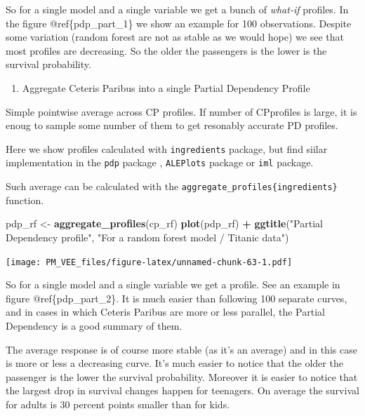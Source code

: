 \documentclass[12pt,]{krantz}
\newenvironment{Shaded}{\begin{snugshade}}{\end{snugshade}}
\newcommand{\KeywordTok}[1]{\textcolor[rgb]{0.13,0.29,0.53}{\textbf{#1}}}
\newcommand{\NormalTok}[1]{#1}
\newcommand{\OperatorTok}[1]{\textcolor[rgb]{0.81,0.36,0.00}{\textbf{#1}}}
\newcommand{\StringTok}[1]{\textcolor[rgb]{0.31,0.60,0.02}{#1}}
\providecommand{\tightlist}{%
  \setlength{\itemsep}{0pt}\setlength{\parskip}{0pt}}
\theoremstyle{definition}
\theoremstyle{definition}
\theoremstyle{definition}
\theoremstyle{remark}
\begin{document}
So for a single model and a single variable we get a bunch of
\emph{what-if} profiles. In the figure @ref\{pdp\_part\_1\} we show an
example for 100 observations. Despite some variation (random forest are
not as stable as we would hope) we see that most profiles are
decreasing. So the older the passengers is the lower is the survival
probability.

\begin{enumerate}
\def\labelenumi{\arabic{enumi}.}
\setcounter{enumi}{1}
\tightlist
\item
  Aggregate Ceteris Paribus into a single Partial Dependency Profile
\end{enumerate}

Simple pointwise average across CP profiles. If number of CPprofiles is
large, it is enoug to sample some number of them to get resonably
accurate PD profiles.

Here we show profiles calculated with \texttt{ingredients} package, but
find siilar implementation in the \texttt{pdp} package \citep{pdp},
\texttt{ALEPlots} package \citep{R-ALEPlot} or \texttt{iml} \citep{iml}
package.

Such average can be calculated with the
\texttt{aggregate\_profiles\{ingredients\}} function.

\begin{Shaded}
\begin{Highlighting}[]
\NormalTok{pdp_rf <-}\StringTok{ }\KeywordTok{aggregate_profiles}\NormalTok{(cp_rf)}
\KeywordTok{plot}\NormalTok{(pdp_rf) }\OperatorTok{+}
\StringTok{  }\KeywordTok{ggtitle}\NormalTok{(}\StringTok{"Partial Dependency profile"}\NormalTok{, }\StringTok{"For a random forest model / Titanic data"}\NormalTok{) }
\end{Highlighting}
\end{Shaded}

\texttt{[image: PM\_VEE\_files/figure-latex/unnamed-chunk-63-1.pdf]}

So for a single model and a single variable we get a profile. See an
example in figure @ref\{pdp\_part\_2\}. It is much easier than following
100 separate curves, and in cases in which Ceteris Paribus are more or
less parallel, the Partial Dependency is a good summary of them.

The average response is of course more stable (as it's an average) and
in this case is more or less a decreasing curve. It's much easier to
notice that the older the passenger is the lower the survival
probability. Moreover it is easier to notice that the largest drop in
survival changes happen for teenagers. On average the survival for
adults is 30 percent points smaller than for kids.
\end{document}
